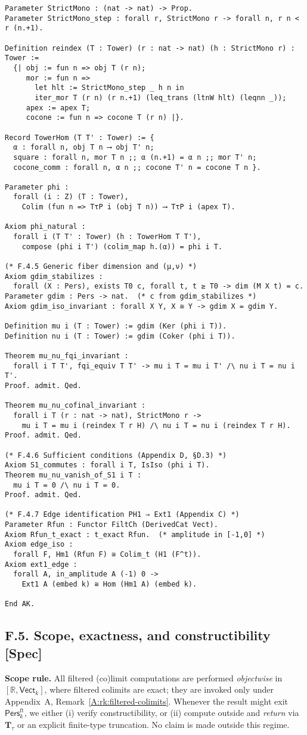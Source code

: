 \documentclass[11pt]{article}
\newcommand{\Pers}{\mathsf{Pers}}
\numberwithin{equation}{section}
\theoremstyle{definition}
\begin{document}
\begin{verbatim}
Parameter StrictMono : (nat -> nat) -> Prop.
Parameter StrictMono_step : forall r, StrictMono r -> forall n, r n < r (n.+1).

Definition reindex (T : Tower) (r : nat -> nat) (h : StrictMono r) : Tower :=
  {| obj := fun n => obj T (r n);
     mor := fun n =>
       let hlt := StrictMono_step _ h n in
       iter_mor T (r n) (r n.+1) (leq_trans (ltnW hlt) (leqnn _));
     apex := apex T;
     cocone := fun n => cocone T (r n) |}.

Record TowerHom (T T' : Tower) := {
  α : forall n, obj T n ⟶ obj T' n;
  square : forall n, mor T n ;; α (n.+1) = α n ;; mor T' n;
  cocone_comm : forall n, α n ;; cocone T' n = cocone T n }.

Parameter phi :
  forall (i : Z) (T : Tower),
    Colim (fun n => TτP i (obj T n)) ⟶ TτP i (apex T).

Axiom phi_natural :
  forall i (T T' : Tower) (h : TowerHom T T'),
    compose (phi i T') (colim_map h.(α)) = phi i T.

(* F.4.5 Generic fiber dimension and (μ,ν) *)
Axiom gdim_stabilizes :
  forall (X : Pers), exists T0 c, forall t, t ≥ T0 -> dim (M X t) = c.
Parameter gdim : Pers -> nat.  (* c from gdim_stabilizes *)
Axiom gdim_iso_invariant : forall X Y, X ≅ Y -> gdim X = gdim Y.

Definition mu i (T : Tower) := gdim (Ker (phi i T)).
Definition nu i (T : Tower) := gdim (Coker (phi i T)).

Theorem mu_nu_fqi_invariant :
  forall i T T', fqi_equiv T T' -> mu i T = mu i T' /\ nu i T = nu i T'.
Proof. admit. Qed.

Theorem mu_nu_cofinal_invariant :
  forall i T (r : nat -> nat), StrictMono r ->
    mu i T = mu i (reindex T r H) /\ nu i T = nu i (reindex T r H).
Proof. admit. Qed.

(* F.4.6 Sufficient conditions (Appendix D, §D.3) *)
Axiom S1_commutes : forall i T, IsIso (phi i T).
Theorem mu_nu_vanish_of_S1 i T :
  mu i T = 0 /\ nu i T = 0.
Proof. admit. Qed.

(* F.4.7 Edge identification PH1 ⇒ Ext1 (Appendix C) *)
Parameter Rfun : Functor FiltCh (DerivedCat Vect).
Axiom Rfun_t_exact : t_exact Rfun.  (* amplitude in [-1,0] *)
Axiom edge_iso :
  forall F, Hm1 (Rfun F) ≅ Colim_t (H1 (F^t)).
Axiom ext1_edge :
  forall A, in_amplitude A (-1) 0 ->
    Ext1 A (embed k) ≅ Hom (Hm1 A) (embed k).

End AK.
\end{verbatim}

\subsection*{F.5. Scope, exactness, and constructibility [Spec]}
\textbf{Scope rule.} All filtered (co)limit computations are performed \emph{objectwise} in
\([\mathbb{R},\mathsf{Vect}_k]\), where filtered colimits are exact; they are invoked only under
Appendix~A, Remark~\ref{A:rk:filtered-colimits}. Whenever the result might exit \(\Pers^{\mathrm{ft}}_k\),
we either (i) verify constructibility, or (ii) compute outside and \emph{return} via \(\mathbf{T}_\tau\)
or an explicit finite-type truncation. No claim is made outside this regime.
\end{document}
